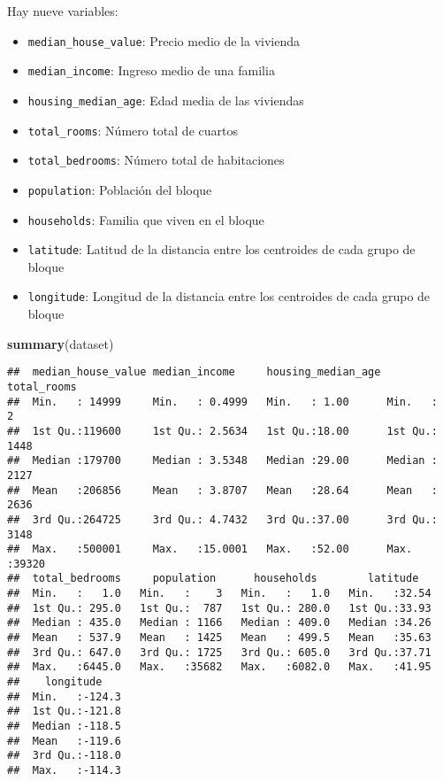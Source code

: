 \documentclass[
]{article}
\newenvironment{Shaded}{\begin{snugshade}}{\end{snugshade}}
\newcommand{\KeywordTok}[1]{\textcolor[rgb]{0.13,0.29,0.53}{\textbf{#1}}}
\newcommand{\NormalTok}[1]{#1}
\begin{document}
Hay nueve variables:

\begin{itemize}
\item
  \texttt{median\_house\_value}: Precio medio de la vivienda
\item
  \texttt{median\_income}: Ingreso medio de una familia
\item
  \texttt{housing\_median\_age}: Edad media de las viviendas
\item
  \texttt{total\_rooms}: Número total de cuartos
\item
  \texttt{total\_bedrooms}: Número total de habitaciones
\item
  \texttt{population}: Población del bloque
\item
  \texttt{households}: Familia que viven en el bloque
\item
  \texttt{latitude}: Latitud de la distancia entre los centroides de
  cada grupo de bloque
\item
  \texttt{longitude}: Longitud de la distancia entre los centroides de
  cada grupo de bloque
\end{itemize}

\begin{Shaded}
\begin{Highlighting}[]
\KeywordTok{summary}\NormalTok{(dataset)}
\end{Highlighting}
\end{Shaded}

\begin{verbatim}
##  median_house_value median_income     housing_median_age  total_rooms   
##  Min.   : 14999     Min.   : 0.4999   Min.   : 1.00      Min.   :    2  
##  1st Qu.:119600     1st Qu.: 2.5634   1st Qu.:18.00      1st Qu.: 1448  
##  Median :179700     Median : 3.5348   Median :29.00      Median : 2127  
##  Mean   :206856     Mean   : 3.8707   Mean   :28.64      Mean   : 2636  
##  3rd Qu.:264725     3rd Qu.: 4.7432   3rd Qu.:37.00      3rd Qu.: 3148  
##  Max.   :500001     Max.   :15.0001   Max.   :52.00      Max.   :39320  
##  total_bedrooms     population      households        latitude    
##  Min.   :   1.0   Min.   :    3   Min.   :   1.0   Min.   :32.54  
##  1st Qu.: 295.0   1st Qu.:  787   1st Qu.: 280.0   1st Qu.:33.93  
##  Median : 435.0   Median : 1166   Median : 409.0   Median :34.26  
##  Mean   : 537.9   Mean   : 1425   Mean   : 499.5   Mean   :35.63  
##  3rd Qu.: 647.0   3rd Qu.: 1725   3rd Qu.: 605.0   3rd Qu.:37.71  
##  Max.   :6445.0   Max.   :35682   Max.   :6082.0   Max.   :41.95  
##    longitude     
##  Min.   :-124.3  
##  1st Qu.:-121.8  
##  Median :-118.5  
##  Mean   :-119.6  
##  3rd Qu.:-118.0  
##  Max.   :-114.3
\end{verbatim}
\end{document}
